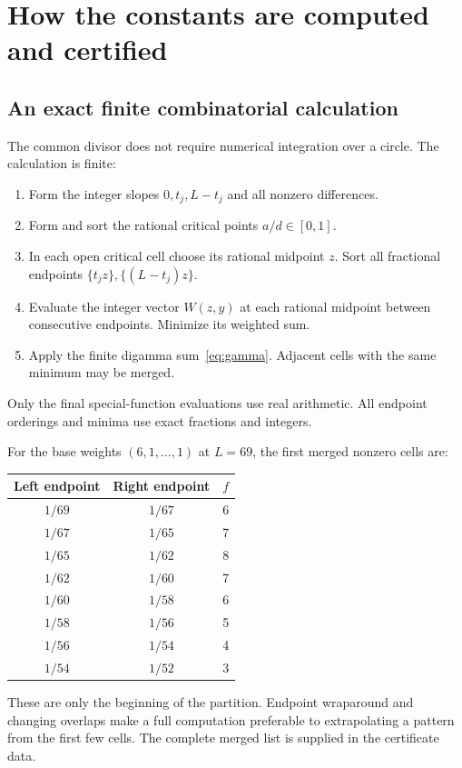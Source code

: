 \section{How the constants are computed and certified}
\label{sec:computation}

\subsection{An exact finite combinatorial calculation}

The common divisor does not require numerical integration over a
circle. The calculation is finite:
\begin{enumerate}
\item Form the integer slopes \(0,t_j,L-t_j\) and all nonzero
differences.
\item Form and sort the rational critical points \(a/d\in[0,1]\).
\item In each open critical cell choose its rational midpoint \(z\).
Sort all fractional endpoints \(\{t_jz\},\{(L-t_j)z\}\).
\item Evaluate the integer vector \(W(z,y)\) at each rational
midpoint between consecutive endpoints. Minimize its weighted sum.
\item Apply the finite digamma sum~\eqref{eq:gamma}. Adjacent cells
with the same minimum may be merged.
\end{enumerate}
Only the final special-function evaluations use real arithmetic.
All endpoint orderings and minima use exact fractions and integers.

For the base weights \((6,1,\ldots,1)\) at \(L=69\), the first
merged nonzero cells are:
\begin{center}
\begin{tabular}{ccc}
\toprule
Left endpoint&Right endpoint&\(f\)\\
\midrule
\(1/69\)&\(1/67\)&6\\
\(1/67\)&\(1/65\)&7\\
\(1/65\)&\(1/62\)&8\\
\(1/62\)&\(1/60\)&7\\
\(1/60\)&\(1/58\)&6\\
\(1/58\)&\(1/56\)&5\\
\(1/56\)&\(1/54\)&4\\
\(1/54\)&\(1/52\)&3\\
\bottomrule
\end{tabular}
\end{center}
These are only the beginning of the partition. Endpoint wraparound
and changing overlaps make a full computation preferable to
extrapolating a pattern from the first few cells.
The complete merged list is supplied in the certificate data.

